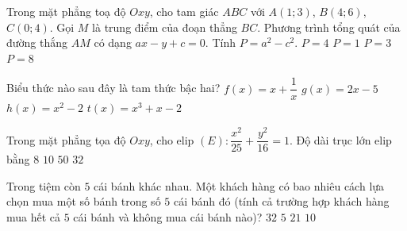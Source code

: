 \begin{ex}%
	Trong mặt phẳng toạ độ $Oxy$, cho tam giác $ABC$ với $A(1;3)$, $B(4;6)$, $C(0;4)$. Gọi $M$ là
	trung điểm của đoạn thẳng $BC$. Phương trình tổng quát của đường thắng $AM$ có dạng
	$ax-y+c=0$. Tính $P=a^2-c^2$.
	\choice
	{$P=4$}	
	{$P=1$}	
	{\True $P=3$}	
	{$P=8$}	
\end{ex}
\begin{ex}%
	Biểu thức nào sau đây là tam thức bậc hai?
	\choice
	{$f(x)=x+\dfrac{1}{x}$}	
	{$g(x)=2x-5$}	
	{\True $h(x)=x^2-2$}	
	{$t(x)=x^3+x-2$}	
\end{ex}
\begin{ex}%
	Trong mặt phẳng tọa độ $Oxy$, cho elip $(E) \colon \dfrac{x^2}{25}+\dfrac{y^2}{16}=1$. Độ dài trục lớn elip bằng
	\choice
	{$8$}	
	{\True $10$}	
	{$50$}	
	{$32$}	
\end{ex}
\begin{ex}%
	Trong tiệm còn $5$ cái bánh khác nhau. Một khách hàng có bao nhiêu cách lựa chọn mua một số bánh trong số $5$ cái bánh đó (tính cả trường hợp khách hàng mua hết cả $5$ cái bánh và không mua cái bánh nào)?
	\choice
	{\True $32$}	
	{$5$}	
	{$21$}	
	{$10$}
\end{ex}
